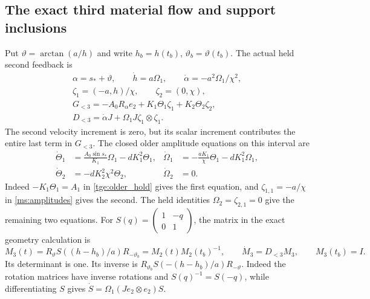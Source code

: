 \subsection{The exact third material flow and support inclusions}

Put $\vartheta=\arctan(a/h)$ and write $h_b=h(t_b)$,
$\vartheta_b=\vartheta(t_b)$. The actual held second feedback is
\begin{equation}\label{tgs:parents}
 \begin{gathered}
 \alpha=s_*+\vartheta,\qquad
 \dot h=a\Omega_1,\qquad
 \dot\alpha=-a^2\Omega_1/\chi^2,\\
 \zeta_1=(-a,h)/\chi,\qquad\zeta_2=(0,\chi),\\
 G_{<3}=-A_0R_\alpha e_2+K_1\Theta_1\zeta_1
                                  +K_2\Theta_2\zeta_2,\\
 D_{<3}=\dot\alpha J+\Omega_1J\zeta_1\otimes\zeta_1.
 \end{gathered}
\end{equation}
The second velocity increment is zero, but its scalar increment
contributes the entire last term in $G_{<3}$.
The closed older amplitude equations on this interval are
\begin{equation}\label{tgs:olderpair}
 \begin{aligned}
 \dot\Theta_1&=\frac{A_0\sin s_*}{K_1}\Omega_1-dK_1^2\Theta_1,
 &\dot\Omega_1&=-\frac{aK_1}{\chi}\Theta_1-dK_1^2\Omega_1,\\
 \dot\Theta_2&=-dK_2^2\chi^2\Theta_2,
 &\dot\Omega_2&=0.
 \end{aligned}
\end{equation}
Indeed $-K_1\Theta_1=A_1$ in \eqref{tge:older_hold}
gives the first equation, and $\zeta_{1,1}=-a/\chi$ in
\eqref{ms:amplitudes} gives the second. The held identities
$\Omega_2=\zeta_{2,1}=0$ give the remaining two equations.
For $S(q)=\left(\begin{smallmatrix}1&-q\\0&1\end{smallmatrix}\right)$,
the matrix in the exact geometry calculation is
\begin{equation}\label{tgs:flow}
 M_3(t)=R_\vartheta S((h-h_b)/a)R_{-\vartheta_b}
       =M_2(t)M_2(t_b)^{-1},\qquad
 \dot M_3=D_{<3}M_3,\qquad M_3(t_b)=I.
\end{equation}
Its determinant is one. Its inverse is
$R_{\vartheta_b}S(-(h-h_b)/a)R_{-\vartheta}$.
Indeed the rotation matrices have inverse rotations and
$S(q)^{-1}=S(-q)$, while differentiating $S$ gives
$\dot S=\Omega_1(J e_2\otimes e_2)S$.
